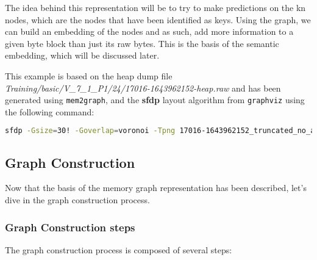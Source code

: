 The idea behind this representation will be to try to make predictions on the \gls{kn} nodes, which are the nodes that have been identified as keys. Using the graph, we can build an embedding of the nodes and as such, add more information to a given byte block than just its raw bytes. This is the basis of the semantic embedding, which will be discussed later.

This example is based on the heap dump file \textit{Training/basic/V\_7\_1\_P1/24/17016-1643962152-heap.raw} and has been generated using \texttt{mem2graph}, and the \textbf{sfdp} layout algorithm from \texttt{graphviz} using the following command:

\begin{lstlisting}[language=bash, caption={Command used to generate the memory graph visualization of \textit{Training/basic/V\_7\_1\_P1/24/17016-1643962152-heap.raw}}]
    sfdp -Gsize=30! -Goverlap=voronoi -Tpng 17016-1643962152_truncated_no_addresses.gv > 17016-1643962152_truncated_no_addresses.png
\end{lstlisting}

\subsection{Graph Construction}
Now that the basis of the memory graph representation has been described, let's dive in the graph construction process. 

\subsubsection{Graph Construction steps}
The graph construction process is composed of several steps:

\begin{comment}
1. graph initialization
* loading a given heap dump file and its associated annotation file
* perform some checks on the annotation file, like checking if the annotation file is valid, that all annotations are present

2. graph building
* build the graph from heap dump byte blocks
* perform data structure detection step
* perform pointer detection step

3. graph annotation
* replace VN by KN from annotation file
* add other annotations like SSH_STRUCT
After this step, its possible to export the graph to a file, like a \texttt{.dot} file or a \texttt{.gv} file for visualization or other purposes.

4. Generate embedding from graph
different embedding are possible. We will focus on the semantic embedding which is a general way to embed the graph by addind the related graph structure and vicinity information to each node.
\end{comment}

